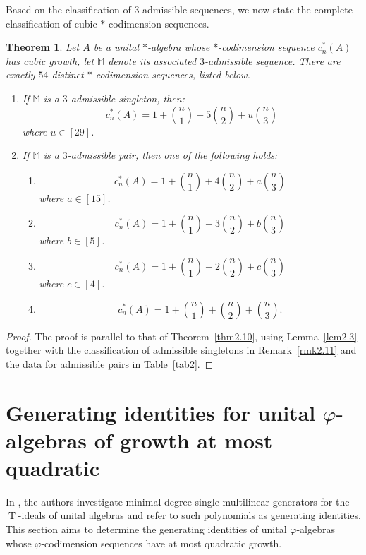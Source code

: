 \documentclass{amsart}
\newtheorem{thm}{Theorem}[section]
\theoremstyle{definition}
\theoremstyle{remark}
\numberwithin{equation}{section}
\def \vp{\varphi}
\def \M{\mathbb{M}}
\def \T{\operatorname{T}}
\begin{document}
	Based on the classification of $3$-admissible sequences, we now state the complete classification of cubic $*$-codimension sequences.

\begin{thm}	\label{thm2.13}
	Let $A$ be a unital $*$-algebra whose $*$-codimension sequence $c_n^*(A)$ has cubic growth, let $\M$ denote its associated $3$-admissible sequence. There are exactly $54$ distinct $*$-codimension sequences, listed below.
	\begin{enumerate}
		\item[(1)]
		If $\M$ is a $3$-admissible singleton, then:
		\[
		c_n^*(A)= 1+\binom{n}{1}+5\binom{n}{2}+u\binom{n}{3}
		\]
		where $u \in [29]$.
		\item[(2)]
		If $\M$ is a $3$-admissible pair, then one of the following holds:
		\begin{enumerate}
			\item[(i)]
			\[
			c_n^*(A)= 1+\binom{n}{1}+4\binom{n}{2}+a\binom{n}{3}
			\]
			where $a \in [15]$.
			\item[(ii)]
			\[
			c_n^*(A)= 1+\binom{n}{1}+3\binom{n}{2}+b\binom{n}{3}
			\]
			where $b \in [5]$. 
			\item[(iii)]
			\[
			c_n^*(A)= 1+\binom{n}{1}+2\binom{n}{2}+c\binom{n}{3}
			\]
			where $c \in [4]$. 
			\item[(iv)]
			\[
			c_n^*(A)= 1+\binom{n}{1}+\binom{n}{2}+\binom{n}{3}.
			\]
		\end{enumerate}
	\end{enumerate}
\end{thm}

\begin{proof}
	The proof is parallel to that of Theorem~\ref{thm2.10}, using Lemma~\ref{lem2.3} together with the classification of admissible singletons in Remark~\ref{rmk2.11} and the data for admissible pairs in Table~\ref{tab2}.
\end{proof}	
	
	
\section{Generating identities for unital $\vp$-algebras of growth at most quadratic}
\label{sec3}
	In \cite{BFXYZZZ}, the authors investigate minimal-degree single multilinear generators for the $\T$-ideals of unital algebras and refer to such polynomials as generating identities. This section aims to determine the generating identities of unital $\vp$-algebras whose $\vp$-codimension sequences have at most quadratic growth.
		
\end{document}

